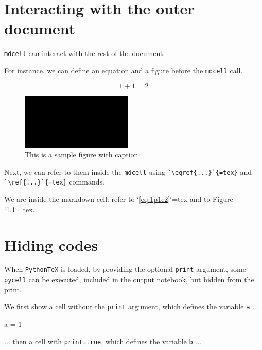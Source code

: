 \documentclass[oneside]{book}
\begin{document}
\chapter{Interacting with the outer document}

\texttt{mdcell} can interact with the rest of the document.

For instance, we can define an equation and a figure before the \texttt{mdcell} call.

\begin{equation}
1 + 1 = 2
\label{eq:1p1e2}
\end{equation}

\begin{figure}
\centering
\includegraphics[width=0.5\linewidth]{images/fail_image_verification.png}
\caption{This is a sample figure with caption}
\label{fig:black}
\end{figure}

Next, we can refer to them inside the \texttt{mdcell} using \verb|`\eqref{...}`{=tex}| and \verb|`\ref{...}`{=tex}| commands.

\begin{mdcell}
We are inside the markdown cell: refer to `\eqref{eq:1p1e2}`{=tex} and to Figure `\ref{fig:black}`{=tex}.
\end{mdcell}

\chapter{Hiding codes}

When \texttt{PythonTeX} is loaded, by providing the optional \texttt{print} argument, some \texttt{pycell} can be executed, included in the output notebook, but hidden from the print.

We first show a cell without the \texttt{print} argument, which defines the variable \texttt{a} ...

\begin{pycell}
a = 1
\end{pycell}

... then a cell with \texttt{print=true}, which defines the variable \texttt{b} ...
\end{document}
